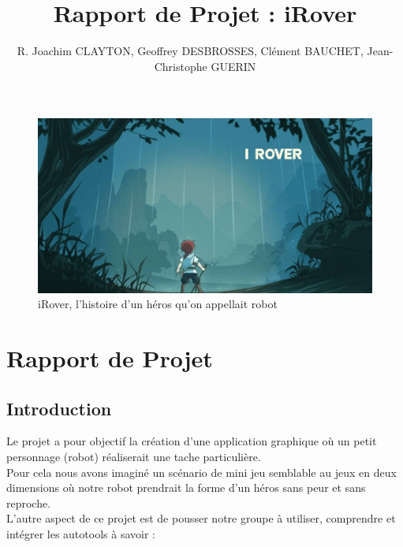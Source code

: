 \documentclass[a4paper 12pts]{article}
\title{Rapport de Projet : iRover}
\author{R. Joachim CLAYTON, Geoffrey DESBROSSES, Clément BAUCHET, Jean-Christophe GUERIN }
\begin{document}
\maketitle


\begin{figure}[h]
   \includegraphics[width=350pt]{Illustration/proj_irover.jpg}
	\caption{iRover, l'histoire d'un héros qu'on appellait robot}
\end{figure}



\newpage


\renewcommand{\contentsname}{Sommaire} 
\tableofcontents

\newpage








\section{Rapport de Projet}


\vspace{2cm}



\subsection{Introduction}

Le projet a pour objectif la création d'une application graphique où un petit personnage (robot) réaliserait une tache particulière.\\
Pour cela nous avons imaginé un scénario de mini jeu semblable au jeux en deux dimensions où notre robot prendrait la forme d'un héros sans peur et sans reproche.\\
L'autre aspect de ce projet est de pousser notre groupe à utiliser, comprendre et intégrer les autotools à savoir : 
\end{document}
